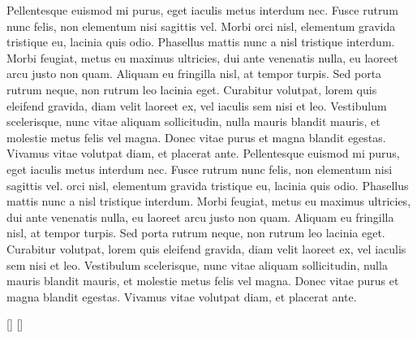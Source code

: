 \documentclass{article}
\makeatletter
\newcommand{\if@series@before}[4]{%
 \StrPosition{\@series}{#1}[\@first]%
 \StrPosition{\@series}{#2}[\@second]%
 \ifnumgreater{\@second}{\@first}{#3}{#4}%
}
\makeatother
\begin{document}
  Pellentesque euismod mi purus, eget iaculis metus interdum nec.
 Fusce rutrum nunc felis, non elementum nisi sagittis vel.
 Morbi orci nisl, elementum gravida tristique eu, lacinia quis odio.
 Phasellus mattis nunc a nisl tristique interdum.
 Morbi feugiat, metus eu maximus ultricies, dui ante venenatis nulla, eu laoreet arcu justo non quam.
 Aliquam eu fringilla nisl, at tempor turpis.
 Sed porta rutrum neque, non rutrum leo lacinia eget.
 Curabitur volutpat, lorem quis eleifend gravida, diam velit laoreet ex, vel iaculis sem nisi et leo.
 Vestibulum scelerisque, nunc vitae aliquam sollicitudin, nulla mauris blandit mauris, et molestie metus felis vel magna.
 Donec vitae purus et magna blandit egestas.
 Vivamus vitae volutpat diam, et placerat ante.
Pellentesque euismod mi purus, eget iaculis metus interdum nec.
 Fusce rutrum nunc felis, non elementum nisi sagittis vel.
  orci nisl, elementum gravida tristique eu, lacinia quis odio.
 Phasellus mattis nunc a nisl tristique interdum.
 Morbi feugiat, metus eu maximus ultricies, dui ante venenatis nulla, eu laoreet arcu justo non quam.
 Aliquam eu fringilla nisl, at tempor turpis.
 Sed porta rutrum neque, non rutrum leo lacinia eget.
 Curabitur volutpat, lorem quis eleifend gravida, diam velit laoreet ex, vel iaculis sem nisi et leo.
 Vestibulum scelerisque, nunc vitae aliquam sollicitudin, nulla mauris blandit mauris, et molestie metus felis vel magna.
 Donec vitae purus et magna blandit egestas.
 Vivamus vitae volutpat diam, et placerat ante.

 


\endnumbering


\if@series@before{A}{B}{avant}{apres}

\the\skip\Afootins

\the\skip\Bfootins
\end{document}
